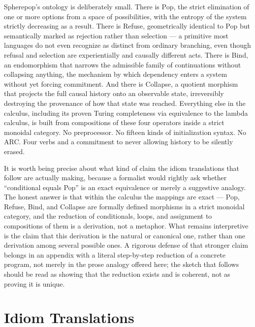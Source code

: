 \documentclass[11pt]{article}
\begin{document}
Spherepop's ontology is deliberately small. There is Pop, the strict elimination of one or more options from a space of possibilities, with the entropy of the system strictly decreasing as a result. There is Refuse, geometrically identical to Pop but semantically marked as rejection rather than selection --- a primitive most languages do not even recognize as distinct from ordinary branching, even though refusal and selection are experientially and causally different acts. There is Bind, an endomorphism that narrows the admissible family of continuations without collapsing anything, the mechanism by which dependency enters a system without yet forcing commitment. And there is Collapse, a quotient morphism that projects the full causal history onto an observable state, irreversibly destroying the provenance of how that state was reached. Everything else in the calculus, including its proven Turing completeness via equivalence to the lambda calculus, is built from compositions of these four operators inside a strict monoidal category. No preprocessor. No fifteen kinds of initialization syntax. No ARC. Four verbs and a commitment to never allowing history to be silently erased.

It is worth being precise about what kind of claim the idiom translations that follow are actually making, because a formalist would rightly ask whether ``conditional equals Pop'' is an exact equivalence or merely a suggestive analogy. The honest answer is that within the calculus the mappings are exact --- Pop, Refuse, Bind, and Collapse are formally defined morphisms in a strict monoidal category, and the reduction of conditionals, loops, and assignment to compositions of them is a derivation, not a metaphor. What remains interpretive is the claim that this derivation is the natural or canonical one, rather than one derivation among several possible ones. A rigorous defense of that stronger claim belongs in an appendix with a literal step-by-step reduction of a concrete program, not merely in the prose analogy offered here; the sketch that follows should be read as showing that the reduction exists and is coherent, not as proving it is unique.

\section{Idiom Translations}
\end{document}
